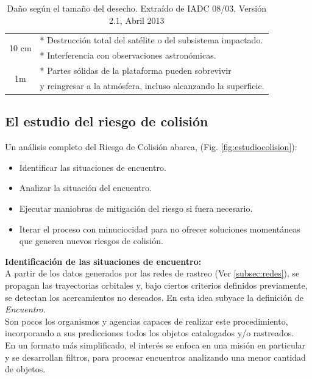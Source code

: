\begin{table}[h]
\begin{tabular}[c]{|c l|}
\hline
\multirow{ 2}{*}{10 cm } & * Destrucci\'on total del sat\'elite o del subsistema impactado.\\
& * Interferencia con observaciones astron\'omicas.\\
\hline
\multirow{ 2}{*}{1m}& * Partes s\'olidas de la plataforma pueden sobrevivir\\
& y reingresar a la atmósfera, incluso alcanzando la superficie.\\
\hline
\end{tabular}
\caption[Da\~no seg\'un el tama\~no del desecho.]{Da\~no seg\'un el tama\~no del desecho. Extra\'ido de IADC 08/03, Versi\'on 2.1, Abril 2013}
\label{tamanioDanio}
\end{table}

\subsection{El estudio del riesgo de colisi\'on}\label{subsec:estudiocolision}

Un an\'alisis completo del Riesgo de Colisi\'on abarca, (Fig. \ref{fig:estudiocolision}):

\begin{itemize}
\setlength{\itemsep}{0pt}
\item Identificar las situaciones de encuentro.
\item Analizar la situaci\'on del encuentro.
\item Ejecutar maniobras de mitigaci\'on del riesgo si fuera necesario.
\item Iterar el proceso con minuciocidad para no ofrecer soluciones moment\'aneas que generen nuevos riesgos de colisi\'on.
\end{itemize}

{\bf{Identificaci\'on de las situaciones de encuentro:}}\\
A partir de los datos generados por las redes de rastreo (Ver \ref{subsec:redes}), se propagan las trayectorias orbitales y, bajo ciertos criterios definidos previamente, se detectan los acercamientos no deseados. En esta idea subyace la definici\'on de {\it{Encuentro}}.\\
Son pocos los organismos y agencias capaces de realizar este procedimiento, incorporando a sus predicciones todos los objetos catalogados y/o rastreados.\\
En un formato m\'as simplificado, el inter\'es se enfoca en una misi\'on en particular y se desarrollan filtros, para procesar encuentros analizando una menor cantidad de objetos.\\


